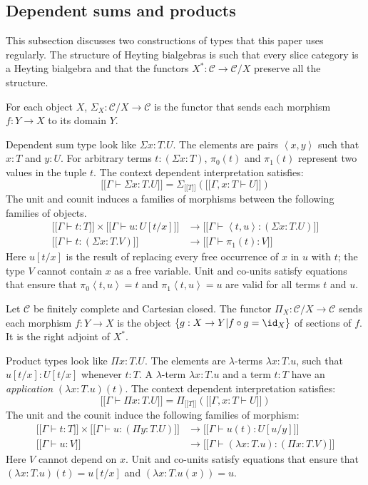 \documentclass{tac}
\newcommand\cat\mathcal
\newcommand\set[1]{\left\{#1\right\}}
\newcommand\ri{^*}
\newcommand\of{:}
\newcommand\db[1]{{[\![}#1{]\!]}}
\newcommand\dsum{\Sigma_}
\newcommand\dprod{\Pi_}
\newcommand\tuplet[1]{\left\langle #1 \right\rangle}
\begin{document}
\subsection{Dependent sums and products}
This subsection discusses two constructions of types that this paper uses regularly. The structure of Heyting bialgebras is such that every slice category is a Heyting bialgebra and that the functors $X\ri\of\cat C\to\cat C/X$ preserve all the structure.


For each object $X$, $\dsum X\of\cat C/X\to \cat C$ is the functor that sends each morphism $f\of Y\to X$ to its domain $Y$.

Dependent sum type look like $\Sigma x\of T.U$. The elements are pairs $\tuplet{x,y}$ such that $x\of T$ and $y\of U$. For arbitrary terms $t\of(\Sigma x\of T)$, $\pi_0(t)$ and $\pi_1(t)$ represent two values in the tuple $t$. The context dependent interpretation satisfies:
\[ \db{\Gamma\vdash\Sigma x\of T.U} = \dsum {\db T}(\db{\Gamma,x\of T\vdash U}) \]
The unit and counit induces a families of morphisms between the following families of objects.
\begin{align*}
\db{\Gamma\vdash t\of T}\times\db{\Gamma\vdash u\of U[t/x]} &\to \db{\Gamma\vdash \tuplet{t, u}\of(\Sigma x\of T.U)}\\
\db{\Gamma\vdash t\of (\Sigma x\of T.V)}&\to \db{\Gamma\vdash \pi_1(t) \of V}
\end{align*}
Here $u[t/x]$ is the result of replacing every free occurrence of $x$ in $u$ with $t$; the type $V$ cannot contain $x$ as a free variable. Unit and co-units satisfy equations that ensure that $\pi_0\tuplet{t,u}=t$ and $\pi_1\tuplet{t,u}=u$ are valid for all terms $t$ and $u$.


Let $\cat C$ be finitely complete and Cartesian closed. The functor $\dprod X\of\cat C/X\to \cat C$ sends each morphism $f\of Y\to X$ is the object $\set{g\of X\to Y| f\circ g = \id_X }$ of sections of $f$. It is the right adjoint of $X\ri$.

Product types look like $\Pi x\of T.U$. The elements are $\lambda$-terms $\lambda x\of T.u$, such that $u[t/x]\of U[t/x]$ whenever $t\of T$. A $\lambda$-term $\lambda x\of T.u$ and a term $t\of T$ have an \emph{application} $(\lambda x\of T.u)(t)$. The context dependent interpretation satisfies:
\[ \db{\Gamma\vdash\Pi x\of T.U} = \dprod {\db T}(\db{\Gamma,x\of T\vdash U}) \]
The unit and the counit induce the following families of morphism:
\begin{align*}
\db{\Gamma\vdash t\of T}\times\db{\Gamma\vdash u\of(\Pi y\of T.U)}&\to\db{\Gamma\vdash u(t)\of U[u/y]}\\
\db{\Gamma\vdash u\of V}&\to\db{\Gamma\vdash (\lambda x\of T.u)\of(\Pi x\of T.V)}
\end{align*}
Here $V$ cannot depend on $x$. Unit and co-units satisfy equations that ensure that $(\lambda x\of T.u)(t) = u[t/x]$ and $(\lambda x\of T.u(x))=u$.
\end{document}
